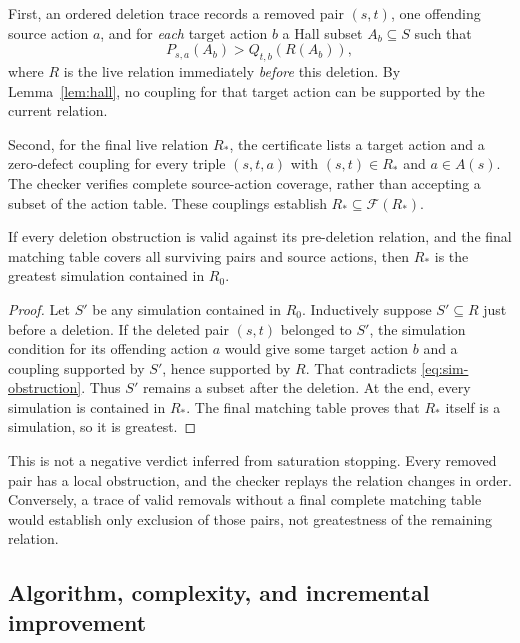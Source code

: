 First, an ordered deletion trace records a removed pair $(s,t)$, one offending
source action $a$, and for \emph{each} target action $b$ a Hall subset
$A_b\subseteq S$ such that
\begin{equation}
 P_{s,a}(A_b)>Q_{t,b}(R(A_b)),
 \label{eq:sim-obstruction}
\end{equation}
where $R$ is the live relation immediately \emph{before} this deletion.
By Lemma~\ref{lem:hall}, no coupling for that target action can be supported
by the current relation.

Second, for the final live relation $R_*$, the certificate lists a target action
and a zero-defect coupling for every triple $(s,t,a)$ with $(s,t)\in R_*$ and
$a\in A(s)$. The checker verifies complete source-action coverage, rather than
accepting a subset of the action table. These couplings establish
$R_*\subseteq\mathcal F(R_*)$.

\begin{theorem}
\label{thm:simulation}
If every deletion obstruction is valid against its pre-deletion relation, and
the final matching table covers all surviving pairs and source actions, then
$R_*$ is the greatest simulation contained in $R_0$.
\end{theorem}
\begin{proof}
Let $S'$ be any simulation contained in $R_0$. Inductively suppose
$S'\subseteq R$ just before a deletion. If the deleted pair $(s,t)$ belonged
to $S'$, the simulation condition for its offending action $a$ would give some
target action $b$ and a coupling supported by $S'$, hence supported by $R$.
That contradicts \eqref{eq:sim-obstruction}. Thus $S'$ remains a subset after
the deletion. At the end, every simulation is contained in $R_*$. The final
matching table proves that $R_*$ itself is a simulation, so it is greatest.
\end{proof}

This is not a negative verdict inferred from saturation stopping. Every removed
pair has a local obstruction, and the checker replays the relation changes
in order. Conversely, a trace of valid removals without a final complete
matching table would establish only exclusion of those pairs, not greatestness
of the remaining relation.

\subsection{Algorithm, complexity, and incremental improvement}

